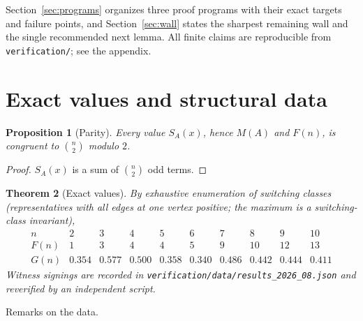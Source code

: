 \documentclass[11pt]{article}
\newtheorem{theorem}{Theorem}[section]
\newtheorem{proposition}[theorem]{Proposition}
\theoremstyle{remark}
\begin{document}
Section~\ref{sec:programs} organizes three proof programs with their
exact targets and failure points, and Section~\ref{sec:wall} states
the sharpest remaining wall and the single recommended next lemma.
All finite claims are reproducible from
\texttt{verification/}; see the appendix.

\section{Exact values and structural data}\label{sec:exact}

\begin{proposition}[Parity]\label{prop:parity}
Every value $S_A(x)$, hence $M(A)$ and $F(n)$, is congruent to
$\binom n2$ modulo $2$.
\end{proposition}
\begin{proof}
$S_A(x)$ is a sum of $\binom n2$ odd terms.
\end{proof}

\begin{theorem}[Exact values]\label{thm:exact}
By exhaustive enumeration of switching classes (representatives with
all edges at one vertex positive; the maximum is a switching-class
invariant),
\[
\begin{array}{c|ccccccccc}
n&2&3&4&5&6&7&8&9&10\\\hline
F(n)&1&3&4&4&5&9&10&12&13\\
G(n)&0.354&0.577&0.500&0.358&0.340&0.486&0.442&0.444&0.411
\end{array}
\]
Witness signings are recorded in
\texttt{verification/data/results\_2026\_08.json} and reverified by an
independent script.
\end{theorem}

Remarks on the data.
\end{document}

